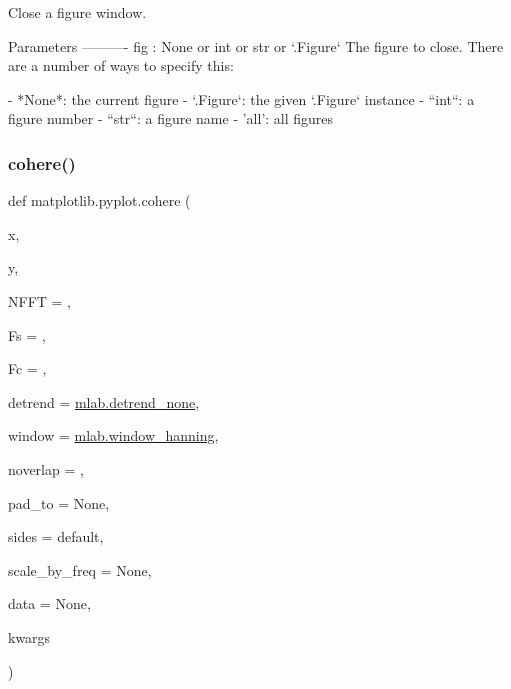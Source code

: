 \begin{DoxyVerb}Close a figure window.

Parameters
----------
fig : None or int or str or `.Figure`
    The figure to close. There are a number of ways to specify this:

    - *None*: the current figure
    - `.Figure`: the given `.Figure` instance
    - ``int``: a figure number
    - ``str``: a figure name
    - 'all': all figures\end{DoxyVerb}
 \mbox{\label{namespacematplotlib_1_1pyplot_a3b6975fc698226c2cd6e2be4c29a9558}} 
\subsubsection{\texorpdfstring{cohere()}{cohere()}}
{\footnotesize\ttfamily def matplotlib.\+pyplot.\+cohere (\begin{DoxyParamCaption}\item[{}]{x,  }\item[{}]{y,  }\item[{}]{N\+F\+FT = {},  }\item[{}]{Fs = {},  }\item[{}]{Fc = {},  }\item[{}]{detrend = {\ttfamily \hyperlink{namespacematplotlib_1_1mlab_a359979aa8e0e635738648ca88ebd5e1d}{mlab.\+detrend\+\_\+none}},  }\item[{}]{window = {\ttfamily \hyperlink{namespacematplotlib_1_1mlab_a0be4c7ab27102a4d8ceb0a08a32ac0fc}{mlab.\+window\+\_\+hanning}},  }\item[{}]{noverlap = {},  }\item[{}]{pad\+\_\+to = {\ttfamily None},  }\item[{}]{sides = {\ttfamily \textquotesingle{}default\textquotesingle{}},  }\item[{}]{scale\+\_\+by\+\_\+freq = {\ttfamily None},  }\item[{}]{data = {\ttfamily None},  }\item[{}]{kwargs }\end{DoxyParamCaption})}

\mbox{\label{namespacematplotlib_1_1pyplot_a1069e3a8f87355da5e901fde9b15c40e}} 
